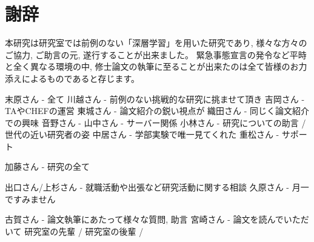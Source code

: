 
\clearpage

\chapter*{謝辞} \label{sec:Acknowledgement}

本研究は研究室では前例のない「深層学習」を用いた研究であり, 様々な方々のご協力, ご助言の元, 遂行することが出来ました。
緊急事態宣言の発令など平時と全く異なる環境の中, 修士論文の執筆に至ることが出来たのは全て皆様のお力添えによるものであると存じます。


末原さん - 全て
川越さん - 前例のない挑戦的な研究に挑ませて頂き
吉岡さん - TAやCHEFの運営
東城さん - 論文紹介の鋭い視点が
織田さん - 同じく論文紹介での興味
音野さん - 
山中さん - サーバー関係
小林さん - 研究についての助言 / 世代の近い研究者の姿
中居さん - 学部実験で唯一見てくれた
重松さん - サポート

加藤さん - 研究の全て

出口さん/上杉さん - 就職活動や出張など研究活動に関する相談
久原さん - 月一ですみません

古賀さん - 論文執筆にあたって様々な質問, 助言
宮崎さん - 論文を読んでいただいて
研究室の先輩 / 
研究室の後輩 /